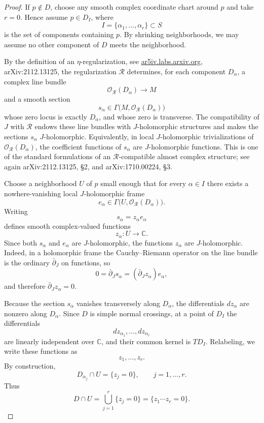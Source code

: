 \documentclass[11pt]{article}
\theoremstyle{definition}
\begin{document}
\begin{proof}
If \(p\notin D\), choose any smooth complex coordinate chart around \(p\) and take \(r=0\).  Hence assume \(p\in D_I\), where
\[
I=\{\alpha_1,\dots,\alpha_r\}\subset S
\]
is the set of components containing \(p\).  By shrinking neighborhoods, we may assume no other component of \(D\) meets the neighborhood.

By the definition of an \(\eta\)-regularization, see \href{https://ar5iv.labs.arxiv.org/html/2112.13125}{ar5iv.labs.arxiv.org}, arXiv:2112.13125, the regularization \(\mathcal R\) determines, for each component \(D_\alpha\), a complex line bundle
\[
\mathcal O_{\mathcal R} (D_\alpha)\longrightarrow M
\]
and a smooth section
\[
s_\alpha\in \Gamma\bigl(M,\mathcal O_{\mathcal R}(D_\alpha)\bigr)
\]
whose zero locus is exactly \(D_\alpha\), and whose zero is transverse.  The compatibility of \(J\) with \(\mathcal R\) endows these line bundles with \(J\)-holomorphic structures and makes the sections \(s_\alpha\) \(J\)-holomorphic.  Equivalently, in local \(J\)-holomorphic trivializations of \(\mathcal O_{\mathcal R}(D_\alpha)\), the coefficient functions of \(s_\alpha\) are \(J\)-holomorphic functions.  This is one of the standard formulations of an \(\mathcal R\)-compatible almost complex structure; see again arXiv:2112.13125, \S2, and arXiv:1710.00224, \S3.

Choose a neighborhood \(U\) of \(p\) small enough that for every \(\alpha\in I\) there exists a nowhere-vanishing local \(J\)-holomorphic frame
\[
e_\alpha\in \Gamma\bigl(U,\mathcal O_{\mathcal R}(D_\alpha)\bigr).
\]
Writing
\[
s_\alpha=z_\alpha e_\alpha
\]
defines smooth complex-valued functions
\[
z_\alpha:U\longrightarrow \mathbb C.
\]
Since both \(s_\alpha\) and \(e_\alpha\) are \(J\)-holomorphic, the functions \(z_\alpha\) are \(J\)-holomorphic.  Indeed, in a holomorphic frame the Cauchy--Riemann operator on the line bundle is the ordinary \(\bar\partial_J\) on functions, so
\[
0=\bar\partial_J s_\alpha=(\bar\partial_J z_\alpha)e_\alpha,
\]
and therefore \(\bar\partial_J z_\alpha=0\).

Because the section \(s_\alpha\) vanishes transversely along \(D_\alpha\), the differentials \(dz_\alpha\) are nonzero along \(D_\alpha\).  Since \(D\) is simple normal crossings, at a point of \(D_I\) the differentials
\[
dz_{\alpha_1},\dots,dz_{\alpha_r}
\]
are linearly independent over \(\mathbb C\), and their common kernel is \(T D_I\).  Relabeling, we write these functions as
\[
z_1,\dots,z_r.
\]
By construction,
\[
D_{\alpha_j}\cap U=\{z_j=0\},\qquad j=1,\dots,r.
\]
Thus
\[
D\cap U=\bigcup_{j=1}^r \{z_j=0\}=\{z_1\cdots z_r=0\}.
\]


\end{proof}
\end{document}
